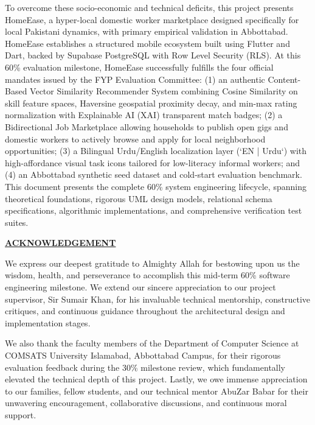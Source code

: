 \documentclass[12pt,a4paper]{article}
\newcommand{\urduword}{Urdu}
\newcommand{\urduword}{Urdu}
\begin{document}
To overcome these socio-economic and technical deficits, this project presents HomeEase, a hyper-local domestic worker marketplace designed specifically for local Pakistani dynamics, with primary empirical validation in Abbottabad. HomeEase establishes a structured mobile ecosystem built using Flutter and Dart, backed by Supabase PostgreSQL with Row Level Security (RLS). At this 60\% evaluation milestone, HomeEase successfully fulfills the four official mandates issued by the FYP Evaluation Committee: (1) an authentic Content-Based Vector Similarity Recommender System combining Cosine Similarity on skill feature spaces, Haversine geospatial proximity decay, and min-max rating normalization with Explainable AI (XAI) transparent match badges; (2) a Bidirectional Job Marketplace allowing households to publish open gigs and domestic workers to actively browse and apply for local neighborhood opportunities; (3) a Bilingual Urdu/English localization layer (`EN | \urduword`) with high-affordance visual task icons tailored for low-literacy informal workers; and (4) an Abbottabad synthetic seed dataset and cold-start evaluation benchmark. This document presents the complete 60\% system engineering lifecycle, spanning theoretical foundations, rigorous UML design models, relational schema specifications, algorithmic implementations, and comprehensive verification test suites.

\clearpage
{\centering\bfseries\underline{ACKNOWLEDGEMENT}\par}
\vspace{8pt}
We express our deepest gratitude to Almighty Allah for bestowing upon us the wisdom, health, and perseverance to accomplish this mid-term 60\% software engineering milestone. We extend our sincere appreciation to our project supervisor, Sir Sumair Khan, for his invaluable technical mentorship, constructive critiques, and continuous guidance throughout the architectural design and implementation stages.

We also thank the faculty members of the Department of Computer Science at COMSATS University Islamabad, Abbottabad Campus, for their rigorous evaluation feedback during the 30\% milestone review, which fundamentally elevated the technical depth of this project. Lastly, we owe immense appreciation to our families, fellow students, and our technical mentor AbuZar Babar for their unwavering encouragement, collaborative discussions, and continuous moral support.
\end{document}
